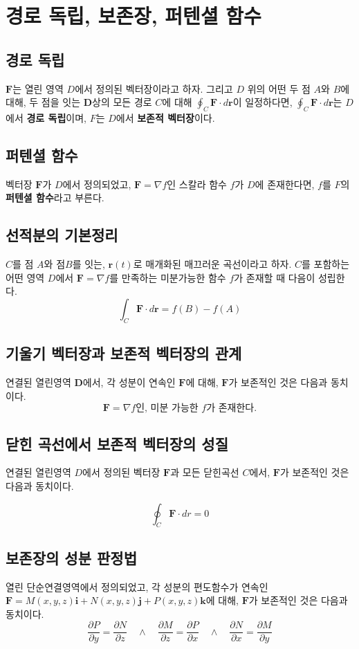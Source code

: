 \documentclass[chapter, oneside]{oblivoir}
\newcommand{\term}[1]{\textbf{#1}}
\begin{document}
\section{경로 독립, 보존장, 퍼텐셜 함수}
\subsection{경로 독립}
$\textbf{F}$는 열린 영역 $D$에서 정의된 벡터장이라고 하자. 그리고 $D$ 위의 어떤 두 점 $A$와 $B$에 대해, 두 점을 잇는 $\textbf{D}$상의 모든 경로 $C$에 대해 $\oint_C \textbf{F} \cdot d\textbf{r} $이 일정하다면, $\oint_C \textbf{F} \cdot d\textbf{r} $는 $D$에서 \term{경로 독립}이며, $F$는 $D$에서 \term{보존적 벡터장}이다.

\subsection{퍼텐셜 함수}
벡터장 $\textbf{F}$가 $D$에서 정의되었고, $\textbf{F} = \nabla f$인 스칼라 함수 $f$가 $D$에 존재한다면, $f$를 $F$의 \term{퍼텐셜 함수}라고 부른다.

\subsection{선적분의 기본정리 }

$C$를 점 $A$와 점$B$를 잇는, $\textbf{r}(t)$로 매개화된 매끄러운 곡선이라고 하자. $C$를 포함하는 어떤 영역 $D$에서 $\textbf{F} = \nabla f$를 만족하는 미분가능한 함수 $f$가 존재할 때 다음이 성립한다.
$$ \int_{C} \textbf{F} \cdot d\textbf{r} = f(B)-f(A)$$

\subsection{기울기 벡터장과 보존적 벡터장의 관계}
연결된 열린영역 $\textbf{D}$에서, 각 성분이 연속인 $\textbf{F}$에 대해, $\textbf{F}$가 보존적인 것은 다음과 동치이다.
$$\textbf{F} = \nabla f \text{인, 미분 가능한 }f\text{가 존재한다.}$$


\subsection{닫힌 곡선에서 보존적 벡터장의 성질}
연결된 열린영역 $D$에서 정의된 벡터장 $\textbf{F}$과 모든 닫힌곡선 $C$에서, $\textbf{F}$가 보존적인 것은 다음과 동치이다.

$$\oint_C \textbf{F} \cdot dr=0$$

\subsection{보존장의 성분 판정법 }
열린 단순연결영역에서 정의되었고, 각 성분의 편도함수가 연속인 $\textbf{F}=M(x,y,z)\textbf{i} + N(x,y,z)\textbf{j} +P(x,y,z)\textbf{k}$에 대해, $\textbf{F}$가 보존적인 것은 다음과 동치이다.
$$ \frac{\partial P}{\partial y}=\frac{\partial N}{\partial z} \quad \land \quad \frac{\partial M}{\partial z}=\frac{\partial P}{\partial x} \quad \land \quad \frac{\partial N}{\partial x}=\frac{\partial M}{\partial y} $$
\end{document}
